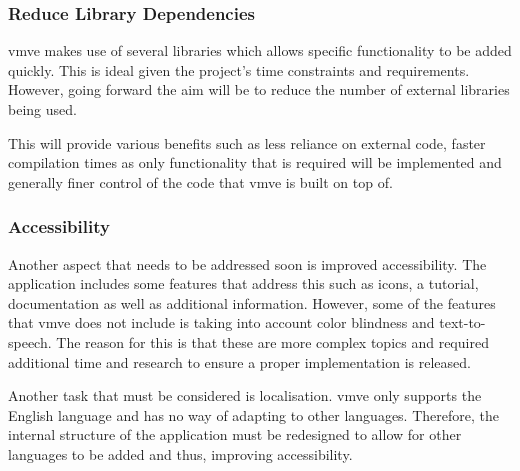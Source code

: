 \documentclass[11pt]{article}
\begin{document}
\subsubsection{Reduce Library Dependencies}
\gls*{vmve} makes use of several libraries which allows specific functionality to
be added quickly. This is ideal given the project's time constraints and
requirements. However, going forward the aim will be to reduce the number of
external libraries being used.

This will provide various benefits such as less reliance on external code,
faster compilation times as only functionality that is required will be
implemented and generally finer control of the code that \gls*{vmve} is built on
top of.

\subsubsection{Accessibility}
Another aspect that needs to be addressed soon is improved accessibility. The
application includes some features that address this such as icons, a tutorial,
documentation as well as additional information. However, some of the features
that \gls*{vmve} does not include is taking into account color blindness and
text-to-speech. The reason for this is that these are more complex topics and
required additional time and research to ensure a proper implementation is
released.

Another task that must be considered is localisation. \gls*{vmve} only supports
the English language and has no way of adapting to other languages. Therefore,
the internal structure of the application must be redesigned to allow for
other languages to be added and thus, improving accessibility.
\end{document}
